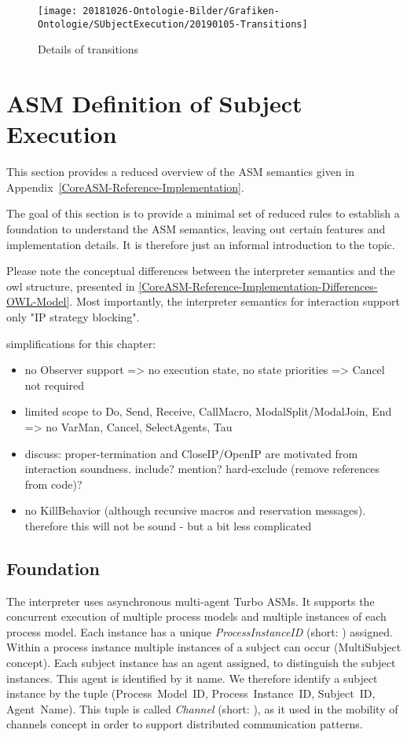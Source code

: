 \begin{figure}[htbp]
	\centering
	\texttt{[image: 20181026-Ontologie-Bilder/Grafiken-Ontologie/SUbjectExecution/20190105-Transitions]}
	\caption[Details of transitions]{Details of transitions}
	\label{fig:20190105-transitions}
\end{figure}


\section{ASM Definition of Subject Execution}


This section provides a reduced overview of the ASM semantics given in Appendix~\ref{CoreASM-Reference-Implementation}.

The goal of this section is to provide a minimal set of reduced rules to establish a foundation to understand the ASM semantics,
leaving out certain features and implementation details.
It is therefore just an informal introduction to the topic.

Please note the conceptual differences between the interpreter semantics and the owl structure, presented in \ref{CoreASM-Reference-Implementation-Differences-OWL-Model}.
Most importantly, the interpreter semantics for interaction support only "IP strategy blocking".

simplifications for this chapter:
\begin{itemize}
	\item no Observer support => no execution state, no state priorities => Cancel not required
	\item limited scope to Do, Send, Receive, CallMacro, ModalSplit/ModalJoin, End => no VarMan, Cancel, SelectAgents, Tau
	\item discuss: proper-termination and CloseIP/OpenIP are motivated from interaction soundness. include? mention? hard-exclude (remove references from code)?
	\item no KillBehavior (although recursive macros and reservation messages). therefore this will not be sound - but a bit less complicated
\end{itemize}

\subsection{Foundation}

The interpreter uses asynchronous multi-agent Turbo ASMs.
It supports the concurrent execution of multiple process models and multiple instances of each process model.
Each instance has a unique \textit{ProcessInstanceID} (short: ) assigned.
Within a process instance multiple instances of a subject can occur (MultiSubject concept).
Each subject instance has an agent assigned, to distinguish the subject instances.
This agent is identified by it name.
We therefore identify a subject instance by the tuple (Process~Model~ID, Process~Instance~ID, Subject~ID, Agent~Name).
This tuple is called \textit{Channel} (short: ), as it used in the mobility of channels concept in order to support distributed communication patterns.

